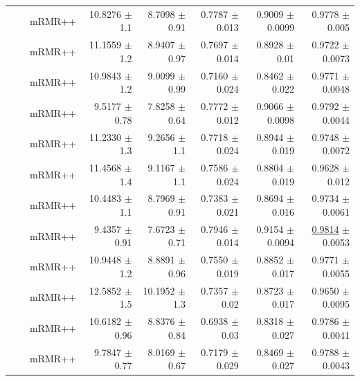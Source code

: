 \begin{longtable}{llp{}rrrrr}
 &  & mRMR++ & 10.8276 {\scriptsize $\pm$ 1.1} & 8.7098 {\scriptsize $\pm$ 0.91} & 0.7787 {\scriptsize $\pm$ 0.013} & 0.9009 {\scriptsize $\pm$ 0.0099} & 0.9778 {\scriptsize $\pm$ 0.005} \\
 &  & mRMR++ & 11.1559 {\scriptsize $\pm$ 1.2} & 8.9407 {\scriptsize $\pm$ 0.97} & 0.7697 {\scriptsize $\pm$ 0.014} & 0.8928 {\scriptsize $\pm$ 0.01} & 0.9722 {\scriptsize $\pm$ 0.0073} \\
 &  & mRMR++ & 10.9843 {\scriptsize $\pm$ 1.2} & 9.0099 {\scriptsize $\pm$ 0.99} & 0.7160 {\scriptsize $\pm$ 0.024} & 0.8462 {\scriptsize $\pm$ 0.022} & 0.9771 {\scriptsize $\pm$ 0.0048} \\
 &  & mRMR++ & 9.5177 {\scriptsize $\pm$ 0.78} & 7.8258 {\scriptsize $\pm$ 0.64} & 0.7772 {\scriptsize $\pm$ 0.012} & 0.9066 {\scriptsize $\pm$ 0.0098} & 0.9792 {\scriptsize $\pm$ 0.0044} \\
 &  & mRMR++ & 11.2330 {\scriptsize $\pm$ 1.3} & 9.2656 {\scriptsize $\pm$ 1.1} & 0.7718 {\scriptsize $\pm$ 0.024} & 0.8944 {\scriptsize $\pm$ 0.019} & 0.9748 {\scriptsize $\pm$ 0.0072} \\
 &  & mRMR++ & 11.4568 {\scriptsize $\pm$ 1.4} & 9.1167 {\scriptsize $\pm$ 1.1} & 0.7586 {\scriptsize $\pm$ 0.024} & 0.8804 {\scriptsize $\pm$ 0.019} & 0.9628 {\scriptsize $\pm$ 0.012} \\
 &  & mRMR++ & 10.4483 {\scriptsize $\pm$ 1.1} & 8.7969 {\scriptsize $\pm$ 0.91} & 0.7383 {\scriptsize $\pm$ 0.021} & 0.8694 {\scriptsize $\pm$ 0.016} & 0.9734 {\scriptsize $\pm$ 0.0061} \\
 &  & mRMR++ & 9.4357 {\scriptsize $\pm$ 0.91} & 7.6723 {\scriptsize $\pm$ 0.71} & 0.7946 {\scriptsize $\pm$ 0.014} & 0.9154 {\scriptsize $\pm$ 0.0094} & \underline{0.9814} {\scriptsize $\pm$ 0.0053} \\
 &  & mRMR++ & 10.9448 {\scriptsize $\pm$ 1.2} & 8.8891 {\scriptsize $\pm$ 0.96} & 0.7550 {\scriptsize $\pm$ 0.019} & 0.8852 {\scriptsize $\pm$ 0.017} & 0.9771 {\scriptsize $\pm$ 0.0055} \\
 &  & mRMR++ & 12.5852 {\scriptsize $\pm$ 1.5} & 10.1952 {\scriptsize $\pm$ 1.3} & 0.7357 {\scriptsize $\pm$ 0.02} & 0.8723 {\scriptsize $\pm$ 0.017} & 0.9650 {\scriptsize $\pm$ 0.0095} \\
 &  & mRMR++ & 10.6182 {\scriptsize $\pm$ 0.96} & 8.8376 {\scriptsize $\pm$ 0.84} & 0.6938 {\scriptsize $\pm$ 0.03} & 0.8318 {\scriptsize $\pm$ 0.027} & 0.9786 {\scriptsize $\pm$ 0.0041} \\
 &  & mRMR++ & 9.7847 {\scriptsize $\pm$ 0.77} & 8.0169 {\scriptsize $\pm$ 0.67} & 0.7179 {\scriptsize $\pm$ 0.029} & 0.8469 {\scriptsize $\pm$ 0.027} & 0.9788 {\scriptsize $\pm$ 0.0043} \\

\end{longtable}
